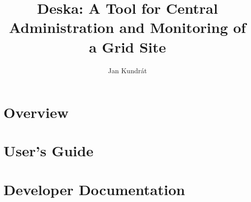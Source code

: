 \documentclass{book}
\begin{document}
\title{Deska: A Tool for Central Administration and Monitoring of a Grid Site}

\author{Jan Kundrát}

\maketitle

\setcounter{tocdepth}{3}
\tableofcontents

\part{Overview}




\part{User's Guide}





\part{Developer Documentation}








%
\end{document}
